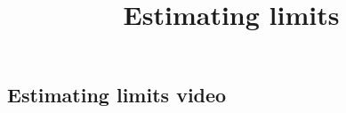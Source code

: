 \documentclass{ximera}
\title{Estimating limits}
\begin{document}
\begin{abstract}
\end{abstract}

\maketitle

\subsection{Estimating limits video}
\begin{center}
\end{center}
\end{document}
